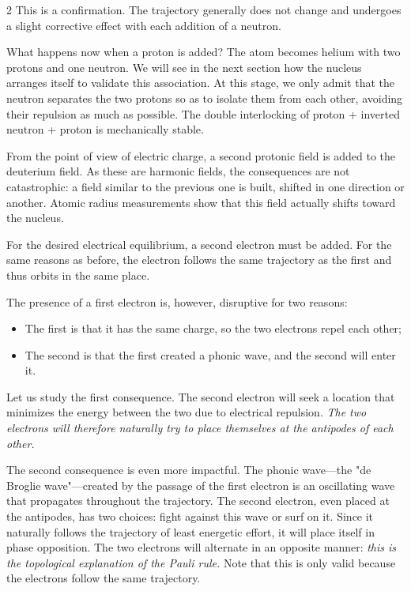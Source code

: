 	\begin{multicols}{2}
	This is a confirmation. The trajectory generally does not change and undergoes a slight corrective effect with each addition of a neutron.
	\medskip
	
	What happens now when a proton is added? The atom becomes helium with two protons and one neutron. We will see in the next section how the nucleus arranges itself to validate this association. At this stage, we only admit that the neutron separates the two protons so as to isolate them from each other, avoiding their repulsion as much as possible. The double interlocking of proton + inverted neutron + proton is mechanically stable.
	
	From the point of view of electric charge, a second protonic field is added to the deuterium field. As these are harmonic fields, the consequences are not catastrophic: a field similar to the previous one is built, shifted in one direction or another. Atomic radius measurements show that this field actually shifts toward the nucleus.
	
	For the desired electrical equilibrium, a second electron must be added. For the same reasons as before, the electron follows the same trajectory as the first and thus orbits in the same place.
	
	The presence of a first electron is, however, disruptive for two reasons:
	\begin{itemize}
		\item The first is that it has the same charge, so the two electrons repel each other;
		\item The second is that the first created a phonic wave, and the second will enter it.
	\end{itemize}
	
	Let us study the first consequence. The second electron will seek a location that minimizes the energy between the two due to electrical repulsion. \textit{The two electrons will therefore naturally try to place themselves at the antipodes of each other.}
	
	The second consequence is even more impactful. The phonic wave—the "de Broglie wave"—created by the passage of the first electron is an oscillating wave that propagates throughout the trajectory. The second electron, even placed at the antipodes, has two choices: fight against this wave or surf on it. Since it naturally follows the trajectory of least energetic effort, it will place itself in phase opposition. The two electrons will alternate in an opposite manner: \textit{this is the topological explanation of the Pauli rule.} Note that this is only valid because the electrons follow the same trajectory.
	

\end{multicols}
